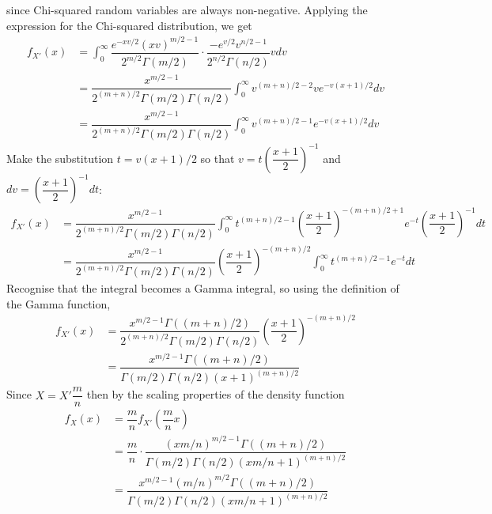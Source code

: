 \documentclass[11pt]{report} %
\begin{document}
since Chi-squared random variables are always non-negative. Applying the expression for the Chi-squared distribution, we get
\begin{align}
f_{X'}\left(x\right) &= \int_{0}^{\infty}\dfrac{e^{-xv/2}\left(xv\right)^{m/2 - 1}}{2^{m/2}\Gamma\left(m/2\right)}\cdot\dfrac{-e^{v/2}v^{n/2 - 1}}{2^{n/2}\Gamma\left(n/2\right)}vdv \\
&= \dfrac{x^{m/2 - 1}}{2^{\left(m + n\right)/2}\Gamma\left(m/2\right)\Gamma\left(n/2\right)}\int_{0}^{\infty}v^{\left(m + n\right)/2-2}ve^{-v\left(x + 1\right)/2}dv \\
&= \dfrac{x^{m/2 - 1}}{2^{\left(m + n\right)/2}\Gamma\left(m/2\right)\Gamma\left(n/2\right)}\int_{0}^{\infty}v^{\left(m + n\right)/2-1}e^{-v\left(x + 1\right)/2}dv
\end{align}
Make the substitution $t = v\left(x + 1\right)/2$ so that $v = t\left(\dfrac{x + 1}{2}\right)^{-1}$ and $dv = \left(\dfrac{x + 1}{2}\right)^{-1}dt$:
\begin{align}
f_{X'}\left(x\right) &= \dfrac{x^{m/2 - 1}}{2^{\left(m + n\right)/2}\Gamma\left(m/2\right)\Gamma\left(n/2\right)}\int_{0}^{\infty}t^{\left(m + n\right)/2-1}\left(\dfrac{x + 1}{2}\right)^{-\left(m + n\right)/2 + 1}e^{-t}\left(\dfrac{x + 1}{2}\right)^{-1}dt \\
&= \dfrac{x^{m/2 - 1}}{2^{\left(m + n\right)/2}\Gamma\left(m/2\right)\Gamma\left(n/2\right)}\left(\dfrac{x + 1}{2}\right)^{-\left(m + n\right)/2}\int_{0}^{\infty}t^{\left(m + n\right)/2-1}e^{-t}dt
\end{align}
Recognise that the integral becomes a Gamma integral, so using the definition of the Gamma function,
\begin{align}
f_{X'}\left(x\right) &= \dfrac{x^{m/2 - 1}\Gamma\left(\left(m + n\right)/2\right)}{2^{\left(m + n\right)/2}\Gamma\left(m/2\right)\Gamma\left(n/2\right)}\left(\dfrac{x + 1}{2}\right)^{-\left(m + n\right)/2} \\
&= \dfrac{x^{m/2 - 1}\Gamma\left(\left(m + n\right)/2\right)}{\Gamma\left(m/2\right)\Gamma\left(n/2\right)\left(x + 1\right)^{\left(m + n\right)/2}} 
\end{align}
Since $X = X'\dfrac{m}{n}$ then by the scaling properties of the density function
\begin{align}
f_{X}\left(x\right) &= \dfrac{m}{n}f_{X'}\left(\dfrac{m}{n}x\right) \\
&= \dfrac{m}{n}\cdot\dfrac{\left(xm/n\right)^{m/2 - 1}\Gamma\left(\left(m + n\right)/2\right)}{\Gamma\left(m/2\right)\Gamma\left(n/2\right)\left(xm/n + 1\right)^{\left(m + n\right)/2}} \\
&= \dfrac{x^{m/2 - 1}\left(m/n\right)^{m/2}\Gamma\left(\left(m + n\right)/2\right)}{\Gamma\left(m/2\right)\Gamma\left(n/2\right)\left(xm/n + 1\right)^{\left(m + n\right)/2}}
\end{align}
\end{document}
